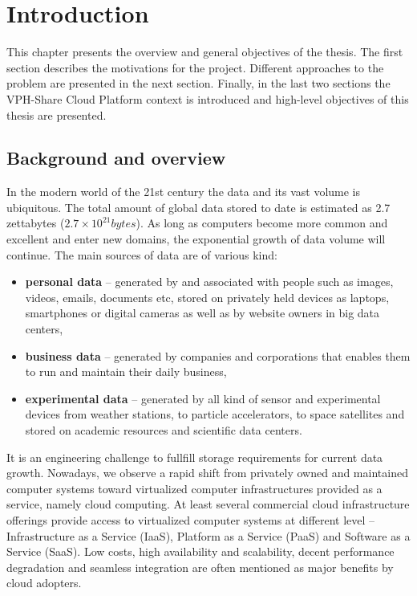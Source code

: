 \chapter{Introduction}
\label{cha:introduction}

This chapter presents the overview and general objectives of the thesis.
The first section describes the motivations for the project. Different
approaches to the problem are presented in the next section. Finally,
in the last two sections the VPH-Share Cloud Platform context is introduced
and high-level objectives of this thesis are presented.
 
\section{Background and overview}
In the modern world of the 21st century the data and its vast volume
is ubiquitous. The total amount of global data stored to date is estimated
as 2.7 zettabytes ($2.7 \times 10^{21}bytes$). As long as computers
become more common and excellent and enter new domains, the exponential
growth of data volume will continue. The main sources of data are
of various kind:

\begin{itemize}
\item \textbf{personal data} -- generated by and associated with people such as
images, videos, emails, documents etc, stored on privately held devices as
laptops, smartphones or digital cameras as well as by website owners in
big data centers,
\item \textbf{business data} -- generated by companies and corporations
that enables them to run and maintain their daily business,
\item \textbf{experimental data} -- generated by all kind of sensor and
experimental devices from weather stations, to particle accelerators, to
space satellites and stored on academic resources and scientific data centers.
\end{itemize}

It is an engineering challenge to fullfill storage requirements for current
data growth. Nowadays, we observe a rapid shift from privately owned and maintained
computer systems toward virtualized computer infrastructures provided as a service,
namely cloud computing. At least several commercial cloud infrastructure offerings 
provide access to virtualized computer systems at different level -- Infrastructure
as a Service (IaaS), Platform as a Service (PaaS) and Software as a Service (SaaS).
Low costs, high availability and scalability, decent performance degradation and 
seamless integration are often mentioned as major benefits by cloud adopters.\\

